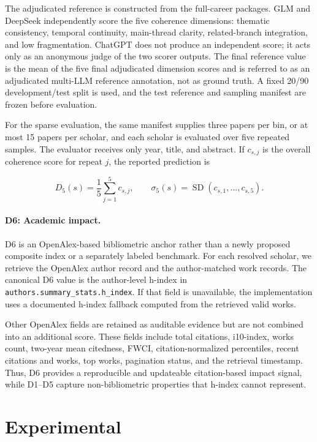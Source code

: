 \documentclass[letterpaper]{article} %
\begin{document}
The adjudicated reference is constructed from the full-career packages. GLM and DeepSeek independently score the five coherence dimensions: thematic consistency, temporal continuity, main-thread clarity, related-branch
integration, and low fragmentation. ChatGPT does not produce an independent score; it acts only as an anonymous judge of the two scorer outputs. The final reference value is the mean of the five final adjudicated dimension scores and is referred to as an adjudicated multi-LLM reference annotation, not as ground truth. A fixed 20/90 development/test split is used, and the test reference and sampling manifest are frozen before evaluation.

For the sparse evaluation, the same manifest supplies three papers per bin, or at most 15 papers per scholar, and each scholar is evaluated over five repeated samples. The evaluator receives only year, title, and abstract. If $c_{s,j}$ is the overall coherence score for repeat $j$, the reported prediction is

\begin{equation}
D_5(s)=\frac{1}{5}\sum_{j=1}^{5}c_{s,j},
\qquad
\sigma_5(s)=\operatorname{SD}(c_{s,1},\ldots,c_{s,5}).
\end{equation}

\paragraph{D6: Academic impact.}
D6 is an OpenAlex-based bibliometric anchor rather than a newly proposed composite index or a separately labeled benchmark. For each resolved scholar, we retrieve the OpenAlex author record and the author-matched work records. The canonical D6 value is the author-level h-index \cite{hirsch2005index} in {\tt authors.summary\_stats.h\_index}. If that field is unavailable, the implementation uses a documented h-index fallback computed from the retrieved
valid works.

Other OpenAlex fields are retained as auditable evidence but are not combined into an additional score. These fields include total citations, i10-index, works count, two-year mean citedness, FWCI, citation-normalized percentiles, recent citations and works, top works, pagination status, and the retrieval timestamp. Thus, D6 provides a reproducible and updateable citation-based impact signal, while D1--D5 capture non-bibliometric properties that h-index cannot represent.

\section{Experimental}
\end{document}

